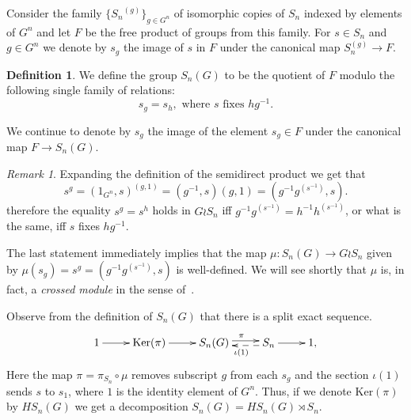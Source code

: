 \documentclass[oneside, 12pt]{amsart}
\theoremstyle{plain}
\numberwithin{equation}{section}
\numberwithin{lemma}{section}
\theoremstyle{remark}
\newtheorem{rem}[lemma]{Remark}
\theoremstyle{definition}
\newtheorem{df}[lemma]{Definition} \Crefname{df}{Definition}{Definitions}
\begin{document}
Consider the family $\{{S_n}^{(g)}\}_{g\in G^n}$ of isomorphic copies of $S_n$ indexed by elements of $G^n$ and let $F$ be the free product of groups from this family.
For $s\in S_n$ and $g\in G^n$ we denote by 
$s_{g}$ the image of $s$ in $F$ under the canonical map $S_n^{(g)} \to F$.

\begin{df} We define the group $S_n(G)$ to be the quotient of $F$ modulo the following single family of relations:
\begin{equation} \label{eq:main_rel} s_g = s_h, \text{ where $s$ fixes $h g^{-1}$.} \end{equation} \end{df}

We continue to denote by $s_g$ the image of the element $s_g\in F$ under the canonical map $F\to S_n(G)$.

\begin{rem}
Expanding the definition of the semidirect product we get that
\begin{equation} \nonumber s^g = (1_{G^n}, s)^{(g, 1)} = (g^{-1}, s) (g, 1) = (g^{-1} g^{(s^{-1})}, s). \end{equation}
therefore the equality $s^g = s^h$ holds in $G \wr S_n$ iff
$g^{-1} g^{(s^{-1})} = h^{-1} h^{(s^{-1})}$, or what is the same, iff $s$ fixes $hg^{-1}$.

The last statement immediately implies that the map $\mu \colon S_n(G) \to G \wr S_n$ given by $\mu(s_g) = s^g = (g^{-1}g^{(s^{-1})}, s)$
is well-defined. We will see shortly that $\mu$ is, in fact, a {\it crossed module} in the sense of~\cite[\S~2.2]{BHS11}.
\end{rem}

Observe from the definition of $S_n(G)$ that there is a split exact sequence.
\begin{equation} \label{eq:ex-seq} \xymatrix{1 \ar[r] & \mathrm{Ker}(\pi) \ar[r] &  S_n(G) \ar@<0.5ex>[r]^{\pi} & S_n \ar[r] \ar@{-->}@<0.5ex>[l]^{\iota(1)} & 1,} \end{equation}
Here the map $\pi = \pi_{S_n} \circ \mu$ removes subscript $g$ from each $s_g$ and the section $\iota(1)$ sends $s$ to $s_1$, where $1$ is the identity element of $G^n$.
Thus, if we denote $\mathrm{Ker}(\pi)$ by $HS_n(G)$ we get a decomposition $S_n(G) = HS_n(G) \rtimes S_n$.
\end{document}
